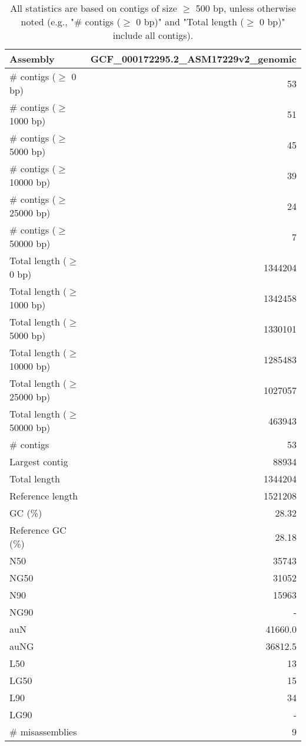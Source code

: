 \documentclass[12pt,a4paper]{article}
\begin{document}
\begin{table}[ht]
\begin{center}
\caption{All statistics are based on contigs of size $\geq$ 500 bp, unless otherwise noted (e.g., "\# contigs ($\geq$ 0 bp)" and "Total length ($\geq$ 0 bp)" include all contigs).}
\begin{tabular}{|l*{1}{|r}|}
\hline
Assembly & GCF\_000172295.2\_ASM17229v2\_genomic \\ \hline
\# contigs ($\geq$ 0 bp) & 53 \\ \hline
\# contigs ($\geq$ 1000 bp) & 51 \\ \hline
\# contigs ($\geq$ 5000 bp) & 45 \\ \hline
\# contigs ($\geq$ 10000 bp) & 39 \\ \hline
\# contigs ($\geq$ 25000 bp) & 24 \\ \hline
\# contigs ($\geq$ 50000 bp) & 7 \\ \hline
Total length ($\geq$ 0 bp) & 1344204 \\ \hline
Total length ($\geq$ 1000 bp) & 1342458 \\ \hline
Total length ($\geq$ 5000 bp) & 1330101 \\ \hline
Total length ($\geq$ 10000 bp) & 1285483 \\ \hline
Total length ($\geq$ 25000 bp) & 1027057 \\ \hline
Total length ($\geq$ 50000 bp) & 463943 \\ \hline
\# contigs & 53 \\ \hline
Largest contig & 88934 \\ \hline
Total length & 1344204 \\ \hline
Reference length & 1521208 \\ \hline
GC (\%) & 28.32 \\ \hline
Reference GC (\%) & 28.18 \\ \hline
N50 & 35743 \\ \hline
NG50 & 31052 \\ \hline
N90 & 15963 \\ \hline
NG90 & - \\ \hline
auN & 41660.0 \\ \hline
auNG & 36812.5 \\ \hline
L50 & 13 \\ \hline
LG50 & 15 \\ \hline
L90 & 34 \\ \hline
LG90 & - \\ \hline
\# misassemblies & 9 \\ \hline

\end{tabular}
\end{center}
\end{table}
\end{document}
